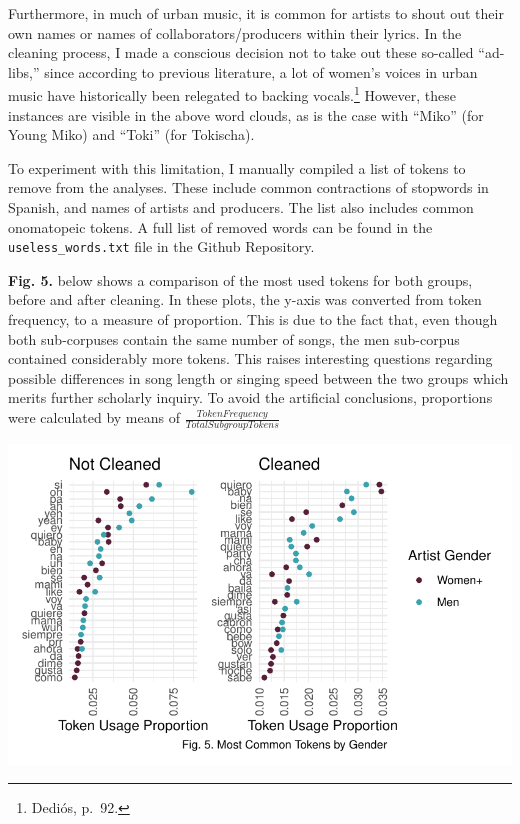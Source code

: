 \documentclass[
  letterpaper,
  DIV=11,
  numbers=noendperiod]{scrartcl}
\begin{document}
Furthermore, in much of urban music, it is common for artists to shout
out their own names or names of collaborators/producers within their
lyrics. In the cleaning process, I made a conscious decision not to take
out these so-called ``ad-libs,'' since according to previous literature,
a lot of women's voices in urban music have historically been relegated
to backing vocals.\footnote{Dediós, p.~92.} However, these instances are
visible in the above word clouds, as is the case with ``Miko'' (for
Young Miko) and ``Toki'' (for Tokischa).

To experiment with this limitation, I manually compiled a list of tokens
to remove from the analyses. These include common contractions of
stopwords in Spanish, and names of artists and producers. The list also
includes common onomatopeic tokens. A full list of removed words can be
found in the \texttt{useless\_words.txt} file in the Github Repository.

\textbf{Fig. 5.} below shows a comparison of the most used tokens for
both groups, before and after cleaning. In these plots, the y-axis was
converted from token frequency, to a measure of proportion. This is due
to the fact that, even though both sub-corpuses contain the same number
of songs, the men sub-corpus contained considerably more tokens. This
raises interesting questions regarding possible differences in song
length or singing speed between the two groups which merits further
scholarly inquiry. To avoid the artificial conclusions, proportions were
calculated by means of \(\frac{Token Frequency}{Total Subgroup Tokens}\)

\includegraphics{Sastoque_Essay3_files/figure-pdf/prop-graph-1.pdf}
\end{document}
